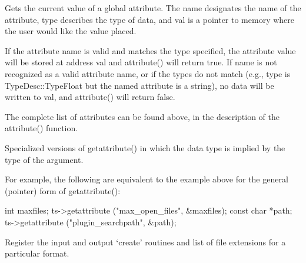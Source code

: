 Gets the current value of a global attribute.  The {\cf name} designates
the name of the attribute, {\cf type} describes the type of data, and
{\cf val} is a pointer to memory where the user would like the value
placed.

If the attribute name is valid and matches the type specified, the
attribute value will be stored at address {\cf val} and {\cf
  attribute()} will return {\cf true}.  If {\cf name} is not recognized
as a valid attribute name, or if the types do not match (e.g., {\cf
  type} is {\cf TypeDesc::TypeFloat} but the named attribute is a
string), no data will be written to {\cf val}, and {\cf attribute()}
will return {\cf false}.

The complete list of attributes can be found above, in the description
of the {\cf attribute()} function.
\apiend

Specialized versions of {\cf getattribute()} in which the data type is
implied by the type of the argument.

For example, the following are equivalent to the example above for the
general (pointer) form of {\cf getattribute()}:

\begin{code}
      int maxfiles;
      ts->getattribute ("max_open_files", &maxfiles);
      const char *path;
      ts->getattribute ("plugin_searchpath", &path);
\end{code}

\apiend


Register the input and output `create' routines and list of file
extensions for a particular format.
\apiend



\chapwidthend

